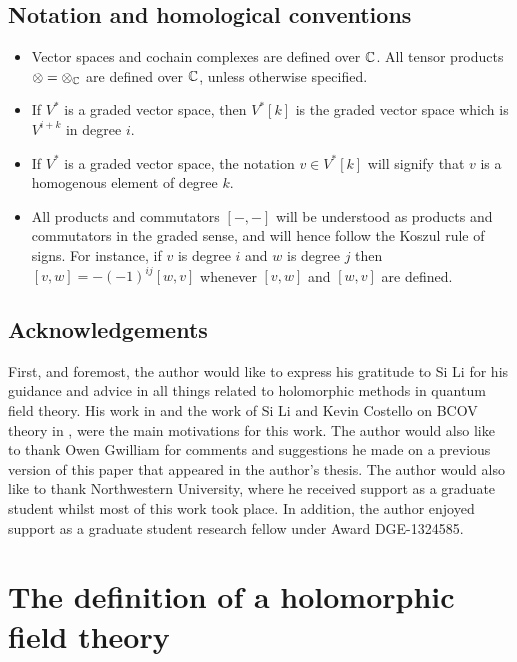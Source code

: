 \documentclass[10pt]{amsart}
\def\brian{\textcolor{blue}{BW: }\textcolor{blue}}
\begin{document}
\subsection*{Notation and homological conventions}

\begin{itemize}
\item Vector spaces and cochain complexes are defined over $\mathbb C$. 
All tensor products $\otimes = \otimes_{\mathbb C}$ are defined over $\mathbb C$, unless otherwise specified. 
\item If $V^*$ is a graded vector space, then $V^*[k]$ is the graded vector space which is $V^{i + k}$ in degree $i$. 
\item If $V^*$ is a graded vector space, the notation $v \in V^* [k]$ will signify that $v$ is a homogenous element of degree $k$.

\item All products and commutators $[-,-]$ will be understood as products and commutators in the graded sense, and will hence follow the Koszul rule of signs. 
For instance, if $v$ is degree $i$ and $w$ is degree $j$ then $[v,w] = -(-1)^{ij} [w,v]$ whenever $[v,w]$ and $[w,v]$ are defined. 


\end{itemize} 
\subsection{Acknowledgements}

First, and foremost, the author would like to express his gratitude to Si Li for his guidance and advice in all things related to holomorphic methods in quantum field theory. 
His work in \cite{LiFeynman} and the work of Si Li and Kevin Costello on BCOV theory in \cite{bcov}, were the main motivations for this work. 
The author would also like to thank Owen Gwilliam for comments and suggestions he made on a previous version of this paper that appeared in the author's thesis. 
The author would also like to thank Northwestern University, where he received support as a graduate student whilst most of this work took place. 
In addition, the author enjoyed support as a graduate student research fellow under Award DGE-1324585. 
 
\section{The definition of a holomorphic field theory}
\end{document}
